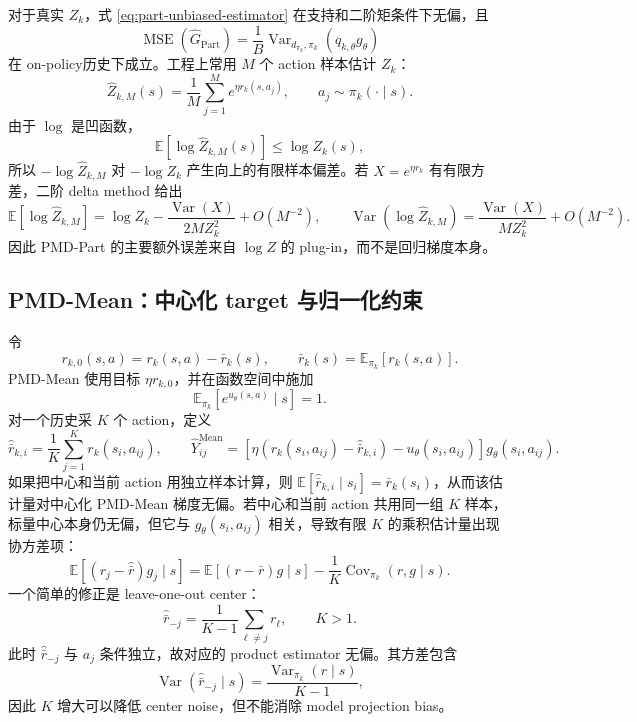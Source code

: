 对于真实 $Z_k$，式 \eqref{eq:part-unbiased-estimator} 在支持和二阶矩条件下无偏，且
\[
 \operatorname{MSE}(\widehat G_{\mathrm{Part}})
 =\frac1B\operatorname{Var}_{d_{\pi_k},\pi_k}(q_{k,\theta}g_\theta)
\]
在 on-policy历史下成立。工程上常用 $M$ 个 action 样本估计 $Z_k$：
\[
 \widehat Z_{k,M}(s)=\frac1M\sum_{j=1}^M e^{\eta r_k(s,a_j)},
 \qquad a_j\sim\pi_k(\cdot\mid s).
\]
由于 $\log$ 是凹函数，\[
 \mathbb E[\log\widehat Z_{k,M}(s)]\leq\log Z_k(s),
\]
所以 $-\log\widehat Z_{k,M}$ 对 $-\log Z_k$ 产生向上的有限样本偏差。若 $X=e^{\eta r_k}$ 有有限方差，二阶 delta method 给出
\begin{equation}
\label{eq:logz-delta-method}
 \mathbb E[\log\widehat Z_{k,M}]
 =\log Z_k-\frac{\operatorname{Var}(X)}{2MZ_k^2}+O(M^{-2}),
 \qquad
 \operatorname{Var}(\log\widehat Z_{k,M})
 =\frac{\operatorname{Var}(X)}{MZ_k^2}+O(M^{-2}).
\end{equation}
因此 PMD-Part 的主要额外误差来自 $\log Z$ 的 plug-in，而不是回归梯度本身。

\subsection{PMD-Mean：中心化 target 与归一化约束}
\label{subsec:estimator-mean}

令
\[
 r_{k,0}(s,a)=r_k(s,a)-\bar r_k(s),
 \qquad
 \bar r_k(s)=\mathbb E_{\pi_k}[r_k(s,a)].
\]
PMD-Mean 使用目标 $\eta r_{k,0}$，并在函数空间中施加
\[
 \mathbb E_{\pi_k}[e^{u_\theta(s,a)}\mid s]=1.
\]
对一个历史采 $K$ 个 action，定义
\[
 \widehat{\bar r}_{k,i}=\frac1K\sum_{j=1}^K r_k(s_i,a_{ij}),
 \qquad
 \widehat Y_{ij}^{\mathrm{Mean}}
 =\left[\eta(r_k(s_i,a_{ij})-\widehat{\bar r}_{k,i})-u_\theta(s_i,a_{ij})\right]g_\theta(s_i,a_{ij}).
\]
如果把中心和当前 action 用独立样本计算，则 $\mathbb E[\widehat{\bar r}_{k,i}\mid s_i]=\bar r_k(s_i)$，从而该估计量对中心化 PMD-Mean 梯度无偏。若中心和当前 action 共用同一组 $K$ 样本，标量中心本身仍无偏，但它与 $g_\theta(s_i,a_{ij})$ 相关，导致有限 $K$ 的乘积估计量出现协方差项：
\begin{equation}
\label{eq:mean-covariance-bias}
 \mathbb E\left[(r_j-\widehat{\bar r})g_j\mid s\right]
 =\mathbb E[(r-\bar r)g\mid s]-\frac1K\operatorname{Cov}_{\pi_k}(r,g\mid s).
\end{equation}
一个简单的修正是 leave-one-out center：
\[
 \widehat{\bar r}_{-j}=\frac1{K-1}\sum_{\ell\ne j}r_{\ell},
 \qquad K>1.
\]
此时 $\widehat{\bar r}_{-j}$ 与 $a_j$ 条件独立，故对应的 product estimator 无偏。其方差包含
\[
 \operatorname{Var}(\widehat{\bar r}_{-j}\mid s)
 =\frac{\operatorname{Var}_{\pi_k}(r\mid s)}{K-1},
\]
因此 $K$ 增大可以降低 center noise，但不能消除 model projection bias。

